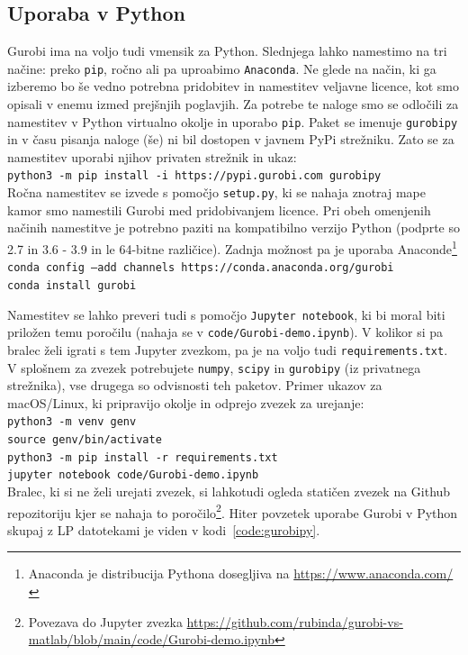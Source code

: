 \documentclass[a4paper,11pt]{article}
\begin{document}
\subsection{Uporaba v Python}
Gurobi ima na voljo tudi vmensik za Python. Slednjega lahko namestimo na tri načine: preko \texttt{pip}, ročno ali pa uproabimo \texttt{Anaconda}. Ne glede na način, ki ga izberemo bo še vedno potrebna pridobitev in namestitev veljavne licence, kot smo opisali v enemu izmed prejšnjih poglavjih. Za potrebe te naloge smo se odločili za namestitev v Python virtualno okolje in uporabo \texttt{pip}. Paket se imenuje \texttt{gurobipy} in v času pisanja naloge (še) ni bil dostopen v javnem PyPi strežniku. Zato se za namestitev uporabi njihov privaten strežnik in ukaz:  \\
\texttt{python3 -m pip install -i https://pypi.gurobi.com gurobipy} \\
Ročna namestitev se izvede s pomočjo \texttt{setup.py}, ki se nahaja znotraj mape kamor smo namestili Gurobi med pridobivanjem licence. Pri obeh omenjenih načinih namestitve je potrebno paziti na kompatibilno verzijo Python (podprte so 2.7 in 3.6 - 3.9 in le 64-bitne različice). Zadnja možnost pa je uporaba Anaconde\footnote{Anaconda je distribucija Pythona dosegljiva na \url{https://www.anaconda.com/}} \\
\texttt{conda config --add channels https://conda.anaconda.org/gurobi} \\
\texttt{conda install gurobi} 

Namestitev se lahko preveri tudi s pomočjo \texttt{Jupyter notebook}, ki bi moral biti priložen temu poročilu (nahaja se v  \texttt{code/Gurobi-demo.ipynb}). V kolikor si pa bralec želi igrati s tem Jupyter zvezkom, pa je na voljo tudi \texttt{requirements.txt}. V splošnem za zvezek potrebujete \texttt{numpy}, \texttt{scipy} in \texttt{gurobipy} (iz privatnega strežnika), vse drugega so odvisnosti teh paketov. Primer ukazov za macOS/Linux, ki pripravijo okolje in odprejo zvezek za urejanje: \\
\texttt{python3 -m venv genv} \\
\texttt{source genv/bin/activate} \\
\texttt{python3 -m pip install -r requirements.txt} \\
\texttt{jupyter notebook code/Gurobi-demo.ipynb} \\
Bralec, ki si ne želi urejati zvezek, si lahkotudi  ogleda statičen zvezek na Github repozitoriju kjer se nahaja to poročilo\footnote{Povezava do Jupyter zvezka \url{https://github.com/rubinda/gurobi-vs-matlab/blob/main/code/Gurobi-demo.ipynb}}. Hiter povzetek uporabe Gurobi v Python skupaj z LP datotekami je viden v kodi~\ref{code:gurobipy}.
\end{document}
